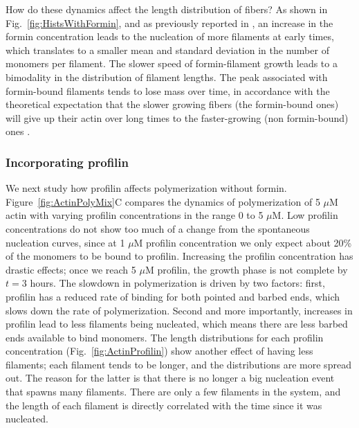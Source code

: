 \documentclass[11pt]{article}
\begin{document}

How do these dynamics affect the length distribution of fibers? As shown in Fig.\ \ref{fig:HistsWithFormin}, and as previously reported in \cite{banerjee2022emergence}, an increase in the formin concentration leads to the nucleation of more filaments at early times, which translates to a smaller mean and standard deviation in the number of monomers per filament. The slower speed of formin-filament growth leads to a bimodality in the distribution of filament lengths. The peak associated with formin-bound filaments tends to lose mass over time, in accordance with the theoretical expectation that the slower growing fibers (the formin-bound ones) will give up their actin over long times to the faster-growing (non formin-bound) ones \cite{mohapatra2017limiting}. 

\subsubsection{Incorporating profilin}

We next study how profilin affects polymerization without formin. Figure\ \ref{fig:ActinPolyMix}C compares the dynamics of polymerization of 5 $\mu$M actin with varying profilin concentrations in the range 0 to 5 $\mu$M. Low profilin concentrations do not show too much of a change from the spontaneous nucleation curves, since at 1 $\mu$M profilin concentration we only expect about 20\% of the monomers to be bound to profilin. Increasing the profilin concentration has drastic effects; once we reach 5 $\mu$M profilin, the growth phase is not complete by $t=3$ hours. The slowdown in polymerization is driven by two factors: first, profilin has a reduced rate of binding for both pointed and barbed ends, which slows down the rate of polymerization. Second and more importantly, increases in profilin lead to less filaments being nucleated, which means there are less barbed ends available to bind monomers. The length distributions for each profilin concentration (Fig.\ \ref{fig:ActinProfilin}) show another effect of having less filaments; each filament tends to be longer, and the distributions are more spread out. The reason for the latter is that there is no longer a big nucleation event that spawns many filaments. There are only a few filaments in the system, and the length of each filament is directly correlated with the time since it was nucleated.
\end{document}
